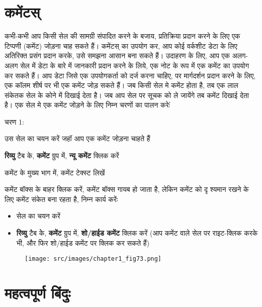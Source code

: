 \section{कमेंटस्}\label{id-1.43}

कभी-कभी आप किसी सेल की सामग्री संपादित करने के बजाय, प्रतिक्रिया प्रदान करने के लिए एक टिप्पणी (कमेंट) जोड़ना चाह सकते हैं। कमेंटस् का उपयोग कर, आप कोई वर्कशीट डेटा के लिए अतिरिक्त प्रसंग प्रदान करके, उसे समझना आसान बना सकते हैं। उदाहरण के लिए, आप एक अलग-अलग सेल में डेटा के बारे में जानकारी प्रदान करने के लिये, एक नोट के रूप में एक कमेंट का उपयोग कर सकते हैं। आप डेटा जिसे एक उपयोगकर्ता को दर्ज करना चाहिए, पर मार्गदर्शन प्रदान करने के लिए, एक कॉलम शीर्ष पर भी एक कमेंट जोड़ सकते हैं। जब किसी सेल मे कमेंट होता है, तब एक लाल संकेतक सेल के कोने में दिखाई देता है। जब आप सेल पर सूचक को ले जायेंगे तब कमेंट दिखाई देता है। एक सेल मे एक कमेंट जोड़ने के लिए निम्न चरणों का पालन करेःं

\begin{descriptionSimple}{चरण 1:}
\item[चरण 1] उस सेल का चयन करें जहॉ आप एक कमेंट जोड़ना चाहते हैं
\item[चरण 2] \textbf{रिव्यु} टैब के, \textbf{कमेंट} ग्रुप  में, \textbf{न्यू कमेंट} क्लिक करें
\item[चरण 3] कमेंट के मुख्य भाग में, कमेंट टेक्स्ट लिखें
\item[चरण 4] कमेंट बॉक्स के बाहर क्लिक करें, कमेंट बॉक्स गायब हो जाता है, लेकिन कमेंट को दृ श्यमान रखने के लिए कमेंट संकेत बना रहता है, निम्न कार्य करेंः
		\begin{itemize}
		\item सेल का चयन करें
		\item \textbf{रिव्यु} टैब केे, \textbf{कमेंट} ग्रुप में, \textbf{शो/हाईड कमेंट} क्लिक करें (आप कमेंट वाले सेल पर राइट-क्लिक करके भी, और फिर शो/हाईड कमेंट पर क्लिक कर सकते हैं)
		\end{itemize}
\end{descriptionSimple}
\medskip

\begin{figure}[H]
\centering
\texttt{[image: src/images/chapter1\_fig73.png]}
\end{figure}				

\section*{महत्वपूर्ण बिंदुः}

